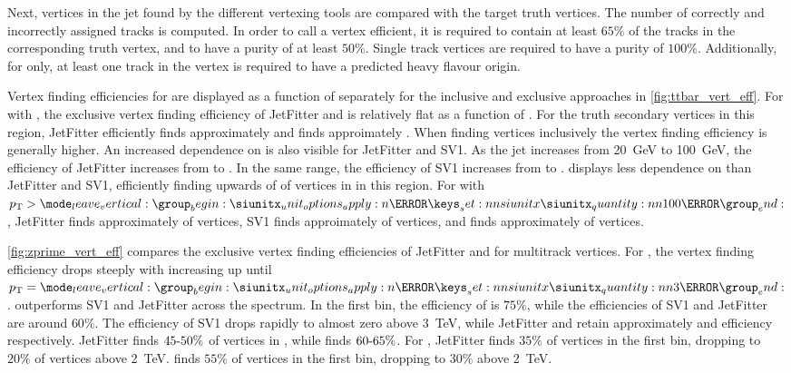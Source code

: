 Next, vertices in the jet found by the different vertexing tools are compared with the target truth vertices.
The number of correctly and incorrectly assigned tracks is computed.
In order to call a vertex efficient, it is required to contain at least $65\%$ of the tracks in the corresponding truth vertex, and to have a purity of at least $50\%$.
Single track vertices are required to have a purity of $100\%$.
Additionally, for \GNN only, at least one track in the vertex is required to have a predicted heavy flavour origin.



Vertex finding efficiencies for \ttbarbjets are displayed as a function of \pt separately for the inclusive and exclusive approaches in \cref{fig:ttbar_vert_eff}.
For \ttbarbjets with \ttbarpt, the exclusive vertex finding efficiency of JetFitter and \GNN is relatively flat as a function of \pt.
For the truth secondary vertices in this \pt region, JetFitter efficiently finds approximately  and \GNN finds approimately .
When finding vertices inclusively the vertex finding efficiency is generally higher.
An increased dependence on \pt is also visible for JetFitter and SV1. As the jet \pt increases from \SI{20}{\GeV} to \SI{100}{\GeV}, the efficiency of JetFitter increases from  to .
In the same range, the efficiency of SV1 increases from  to .
\GNN displays less dependence on \pt than JetFitter and SV1, efficiently finding upwards of  of vertices in \bjets in this \pt region. 
For \bjets with $\pt > \SI{100}{\GeV}$, JetFitter finds approximately  of vertices, SV1 finds approimately  of vertices, and \GNN finds approximately  of vertices.

\cref{fig:zprime_vert_eff} compares the exclusive vertex finding efficiencies of JetFitter and \GNN for multitrack vertices.
For \Zprimebjets, the vertex finding efficiency drops steeply with increasing \pt up until $\pt = \SI{3}{\TeV}$.
\GNN outperforms SV1 and JetFitter across the \pt spectrum.
In the first bin, the efficiency of \GNN is $75\%$, while the efficiencies of SV1 and JetFitter are around $60\%$.
The efficiency of SV1 drops rapidly to almost zero above \SI{3}{\TeV}, while JetFitter and \GNN retain approximately  and  efficiency respectively.
JetFitter finds $45\text{\nobreakdash-}50\%$ of vertices in \ttbarbjets, while \GNN finds $60\text{\nobreakdash-}65\%$.
For \Zprimebjets, JetFitter finds $35\%$ of vertices in the first bin, dropping to $20\%$ of vertices above \SI{2}{\TeV}.
\GNN finds $55\%$ of vertices in the first bin, dropping to $30\%$ above \SI{2}{\TeV}.


